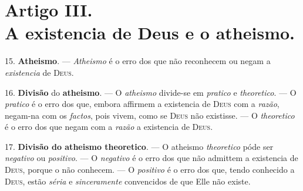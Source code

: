 

\section*{Artigo III.\\ A existencia de Deus e o atheismo.}

15. \textbf{Atheismo}. --- \emph{Atheismo} é o erro dos que não reconhecem ou negam a \emph{existencia} de \textsc{Deus}.

16. \textbf{Divisão} do \textbf{atheismo}. --- O \emph{atheismo} divide-se em \emph{pratico} e \emph{theoretico}. --- O \emph{pratico} é o erro dos que, embora affirmem a existencia de \textsc{Deus} com a \emph{razão}, negam-na com os \emph{factos}, pois vivem, como se \textsc{Deus} não existisse. --- O \emph{theoretico} é o erro dos que negam com a \emph{razão} a existencia de \textsc{Deus}.

17. \textbf{Divisão do atheismo theoretico}. --- O atheismo \emph{theoretico} póde ser \emph{negativo} ou \emph{positivo}. --- O \emph{negativo} é o erro dos que não admittem a existencia de \textsc{Deus}, porque o não conhecem. --- O \emph{positivo} é o erro dos que, tendo conhecido a \textsc{Deus}, estão \emph{séria} e \emph{sinceramente} convencidos de que Elle não existe.
